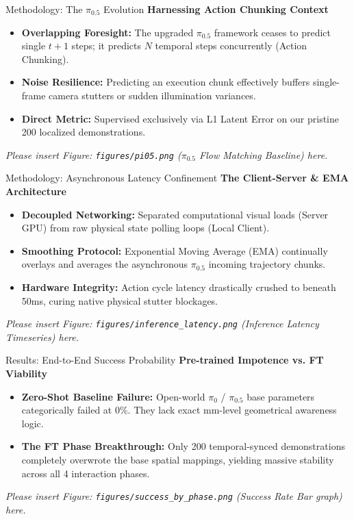 \documentclass[aspectratio=169, t]{beamer}
\begin{document}
\begin{frame}{Methodology: The $\pi_{0.5}$ Evolution}
    {\Large \textbf{Harnessing Action Chunking Context}}
    \vspace{0.5cm}
    \begin{itemize}
        \item \textbf{Overlapping Foresight:} The upgraded $\pi_{0.5}$ framework ceases to predict single $t+1$ steps; it predicts $N$ temporal steps concurrently (Action Chunking).
        \item \textbf{Noise Resilience:} Predicting an execution chunk effectively buffers single-frame camera stutters or sudden illumination variances.
        \item \textbf{Direct Metric:} Supervised exclusively via L1 Latent Error on our pristine 200 localized demonstrations.
    \end{itemize}
    \vfill
    \textit{Please insert Figure: \texttt{figures/pi05.png} ($\pi_{0.5}$ Flow Matching Baseline) here.}
\end{frame}

\begin{frame}{Methodology: Asynchronous Latency Confinement}
    {\Large \textbf{The Client-Server \& EMA Architecture}}
    \vspace{0.5cm}
    \begin{itemize}
        \item \textbf{Decoupled Networking:} Separated computational visual loads (Server GPU) from raw physical state polling loops (Local Client).
        \item \textbf{Smoothing Protocol:} Exponential Moving Average (EMA) continually overlays and averages the asynchronous $\pi_{0.5}$ incoming trajectory chunks. 
        \item \textbf{Hardware Integrity:} Action cycle latency drastically crushed to beneath 50ms, curing native physical stutter blockages.
    \end{itemize}
    \vfill
    \textit{Please insert Figure: \texttt{figures/inference_latency.png} (Inference Latency Timeseries) here.}
\end{frame}

\begin{frame}{Results: End-to-End Success Probability}
    {\Large \textbf{Pre-trained Impotence vs. FT Viability}}
    \vspace{0.5cm}
    \begin{itemize}
        \item \textbf{Zero-Shot Baseline Failure:} Open-world $\pi_0$ / $\pi_{0.5}$ base parameters categorically failed at 0\%. They lack exact mm-level geometrical awareness logic.
        \item \textbf{The FT Phase Breakthrough:} Only 200 temporal-synced demonstrations completely overwrote the base spatial mappings, yielding massive stability across all 4 interaction phases.
    \end{itemize}
    \vfill
    \textit{Please insert Figure: \texttt{figures/success_by_phase.png} (Success Rate Bar graph) here.}
\end{frame}
\end{document}
